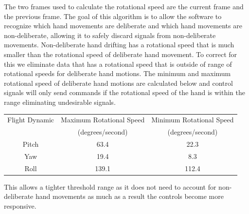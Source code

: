 \documentclass[letterpaper,english, 12pt]{article}
\begin{document}
The two frames used to calculate the rotational speed are the current frame and the previous frame. The goal of this algorithm is to allow the software to recognize which hand movements are deliberate and which hand movements are non-deliberate, allowing it to safely discard signals from non-deliberate movements. Non-deliberate hand drifting has a rotational speed that is much smaller than the rotational speed of deliberate hand movement. To correct for this we eliminate data that has a rotational speed that is outside of range of rotational speeds for deliberate hand motions.
The minimum and maximum rotational speed of deliberate hand motions are calculated below and control signals will only send commands if the rotational speed of the hand is within the range eliminating undesirable signals.

\begin{center}
	\begin{tabular}{|c|c|c|}
		\hline
			Flight Dynamic & Maximum Rotational Speed & Minimum Rotational Speed \\
			 & (degrees/second) & (degrees/second) \\
		\hline
			Pitch & 63.4 & 22.3 \\
		\hline
			Yaw & 19.4 & 8.3 \\
		\hline
			Roll & 139.1 & 112.4 \\
		\hline
	\end{tabular}
\end{center}

This allows a tighter threshold range as it does not need to account for non-deliberate hand movements as much as a result the controls become more responsive.
\end{document}
